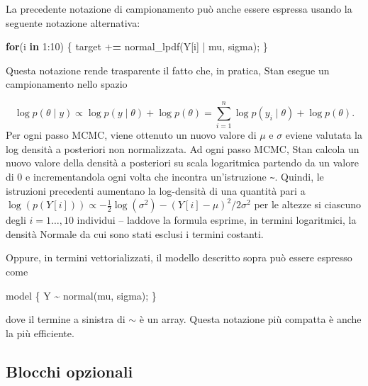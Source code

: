 \documentclass[
]{memoir}
\newenvironment{Shaded}{\begin{snugshade}}{\end{snugshade}}
\newcommand{\ControlFlowTok}[1]{\textcolor[rgb]{0.13,0.29,0.53}{\textbf{#1}}}
\newcommand{\DecValTok}[1]{\textcolor[rgb]{0.00,0.00,0.81}{#1}}
\newcommand{\ErrorTok}[1]{\textcolor[rgb]{0.64,0.00,0.00}{\textbf{#1}}}
\newcommand{\FunctionTok}[1]{\textcolor[rgb]{0.00,0.00,0.00}{#1}}
\newcommand{\NormalTok}[1]{#1}
\newcommand{\SpecialCharTok}[1]{\textcolor[rgb]{0.00,0.00,0.00}{#1}}
\begin{document}
La precedente notazione di campionamento può anche essere espressa usando la seguente notazione alternativa:

\begin{Shaded}
\begin{Highlighting}[]
  \ControlFlowTok{for}\NormalTok{(i }\ControlFlowTok{in} \DecValTok{1}\SpecialCharTok{:}\DecValTok{10}\NormalTok{) \{}
\NormalTok{    target }\SpecialCharTok{+}\ErrorTok{=} \FunctionTok{normal\_lpdf}\NormalTok{(Y[i] }\SpecialCharTok{|}\NormalTok{ mu, sigma);}
\NormalTok{  \}}
\end{Highlighting}
\end{Shaded}

\noindent
Questa notazione rende trasparente il fatto che, in pratica, Stan esegue un campionamento nello spazio

\[
\log p(\theta \mid y) \propto \log p(y \mid \theta) + \log p(\theta) = \sum_{i=1}^n \log p(y_i \mid \theta) + \log p(\theta).
\]
Per ogni passo MCMC, viene ottenuto un nuovo valore di \(\mu\) e \(\sigma\) eviene valutata la log densità a posteriori non normalizzata. Ad ogni passo MCMC, Stan calcola un nuovo valore della densità a posteriori su scala logaritmica partendo da un valore di 0 e incrementandola ogni volta che incontra un'istruzione \texttt{\textasciitilde{}}. Quindi, le istruzioni precedenti aumentano la log-densità di una quantità pari a \(\log (p(Y[i])) \propto -\frac{1}{2} \log(\sigma^2) - (Y[i]-\mu)^2 / 2\sigma^2\) per le altezze si ciascuno degli \(i=1 \dots, 10\) individui -- laddove la formula esprime, in termini logaritmici, la densità Normale da cui sono stati esclusi i termini costanti.

Oppure, in termini vettorializzati, il modello descritto sopra può essere espresso come

\begin{Shaded}
\begin{Highlighting}[]
\NormalTok{model \{}
\NormalTok{  Y }\SpecialCharTok{\textasciitilde{}} \FunctionTok{normal}\NormalTok{(mu, sigma);}
\NormalTok{\}}
\end{Highlighting}
\end{Shaded}

\noindent
dove il termine a sinistra di \(\sim\) è un array. Questa notazione più compatta è anche la più efficiente.

\hypertarget{blocchi-opzionali}{%
\subsection{Blocchi opzionali}\label{blocchi-opzionali}}
\end{document}
